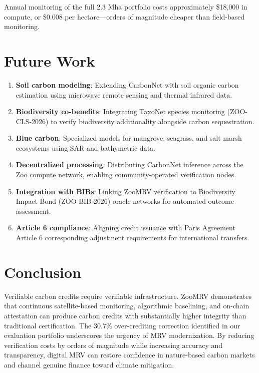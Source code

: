 \documentclass[11pt,a4paper]{article}
\begin{document}
Annual monitoring of the full 2.3 Mha portfolio costs approximately
\$18{,}000 in compute, or \$0.008 per hectare---orders of magnitude
cheaper than field-based monitoring.


\section{Future Work}
\label{sec:future}

\begin{enumerate}
  \item \textbf{Soil carbon modeling}: Extending CarbonNet with soil
    organic carbon estimation using microwave remote sensing and thermal
    infrared data.
  \item \textbf{Biodiversity co-benefits}: Integrating TaxoNet species
    monitoring (ZOO-CLS-2026) to verify biodiversity additionality
    alongside carbon sequestration.
  \item \textbf{Blue carbon}: Specialized models for mangrove, seagrass,
    and salt marsh ecosystems using SAR and bathymetric data.
  \item \textbf{Decentralized processing}: Distributing CarbonNet
    inference across the Zoo compute network, enabling community-operated
    verification nodes.
  \item \textbf{Integration with BIBs}: Linking ZooMRV verification
    to Biodiversity Impact Bond (ZOO-BIB-2026) oracle networks for
    automated outcome assessment.
  \item \textbf{Article 6 compliance}: Aligning credit issuance with
    Paris Agreement Article 6 corresponding adjustment requirements for
    international transfers.
\end{enumerate}


\section{Conclusion}
\label{sec:conclusion}

Verifiable carbon credits require verifiable infrastructure. ZooMRV
demonstrates that continuous satellite-based monitoring, algorithmic
baselining, and on-chain attestation can produce carbon credits with
substantially higher integrity than traditional certification. The
30.7\% over-crediting correction identified in our evaluation portfolio
underscores the urgency of MRV modernization. By reducing verification
costs by orders of magnitude while increasing accuracy and transparency,
digital MRV can restore confidence in nature-based carbon markets and
channel genuine finance toward climate mitigation.
\end{document}
